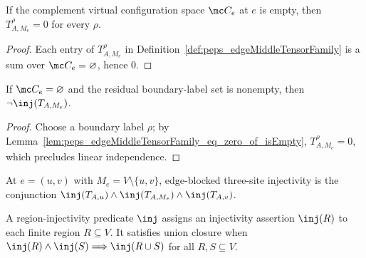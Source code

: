 \begin{lemma}%
    \label{lem:peps_edgeMiddleTensorFamily_eq_zero_of_isEmpty}
    \leanok
    If the complement virtual configuration space $\mc C_e$ at $e$ is empty,
    then $T_{A,M_e}^{\rho}=0$ for every $\rho$.
\end{lemma}
\begin{proof}\leanok
    Each entry of $T_{A,M_e}^{\rho}$ in Definition~\ref{def:peps_edgeMiddleTensorFamily}
    is a sum over $\mc C_e=\varnothing$, hence $0$.
\end{proof}

\begin{lemma}%
    \label{lem:peps_not_edgeMiddleTensorInjective_of_isEmpty}
    \leanok
    If $\mc C_e=\varnothing$ and the residual boundary-label set is nonempty,
    then $\neg\inj(T_{A,M_e})$.
\end{lemma}
\begin{proof}\leanok
    Choose a boundary label $\rho$; by
    Lemma~\ref{lem:peps_edgeMiddleTensorFamily_eq_zero_of_isEmpty},
    $T_{A,M_e}^{\rho}=0$, which precludes linear independence.
\end{proof}

\begin{definition}%
    \label{def:peps_edgeBlockedThreeSiteInjective}
    \leanok
    At $e=(u,v)$ with $M_e=V\setminus\{u,v\}$, edge-blocked three-site
    injectivity is the conjunction
    $\inj(T_{A,u})\wedge\inj(T_{A,M_e})\wedge\inj(T_{A,v})$.
\end{definition}

\begin{definition}%
    \label{def:peps_regionInjectivityData}
    \leanok
    A region-injectivity predicate $\inj$ assigns an injectivity assertion
    $\inj(R)$ to each finite region $R\subseteq V$. It satisfies union closure
    when $\inj(R)\wedge\inj(S)\Longrightarrow\inj(R\cup S)$ for all $R,S\subseteq V$.
\end{definition}

